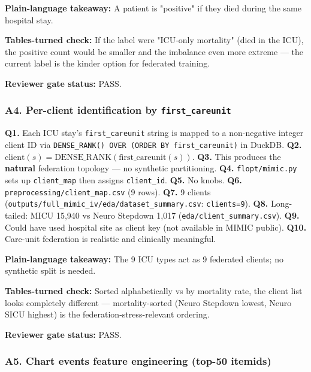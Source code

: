 \documentclass{article}
\begin{document}
\textbf{Plain-language takeaway:} A patient is "positive" if they died during the same hospital stay.


\textbf{Tables-turned check:} If the label were "ICU-only mortality" (died in the ICU), the positive count would be smaller and the imbalance even more extreme --- the current label is the kinder option for federated training.


\textbf{Reviewer gate status:} PASS.


\subsubsection{A4. Per-client identification by \texttt{first\_careunit}}


\textbf{Q1.} Each ICU stay's \texttt{first\_careunit} string is mapped to a non-negative integer client ID via \texttt{DENSE\_RANK() OVER (ORDER BY first\_careunit)} in DuckDB. \textbf{Q2.} \(\text{client}(s) = \text{DENSE\_RANK}(\text{first\_careunit}(s))\). \textbf{Q3.} This produces the \textbf{natural} federation topology --- no synthetic partitioning. \textbf{Q4.} \texttt{flopt/mimic.py} sets up \texttt{client\_map} then assigns \texttt{client\_id}. \textbf{Q5.} No knobs. \textbf{Q6.} \texttt{preprocessing/client\_map.csv} (9 rows). \textbf{Q7.} 9 clients (\texttt{outputs/full\_mimic\_iv/eda/dataset\_summary.csv}: \texttt{clients=9}). \textbf{Q8.} Long-tailed: MICU 15,940 vs Neuro Stepdown 1,017 (\texttt{eda/client\_summary.csv}). \textbf{Q9.} Could have used hospital site as client key (not available in MIMIC public). \textbf{Q10.} Care-unit federation is realistic and clinically meaningful.


\textbf{Plain-language takeaway:} The 9 ICU types act as 9 federated clients; no synthetic split is needed.


\textbf{Tables-turned check:} Sorted alphabetically vs by mortality rate, the client list looks completely different --- mortality-sorted (Neuro Stepdown lowest, Neuro SICU highest) is the federation-stress-relevant ordering.


\textbf{Reviewer gate status:} PASS.


\subsubsection{A5. Chart events feature engineering (top-50 itemids)}
\end{document}
